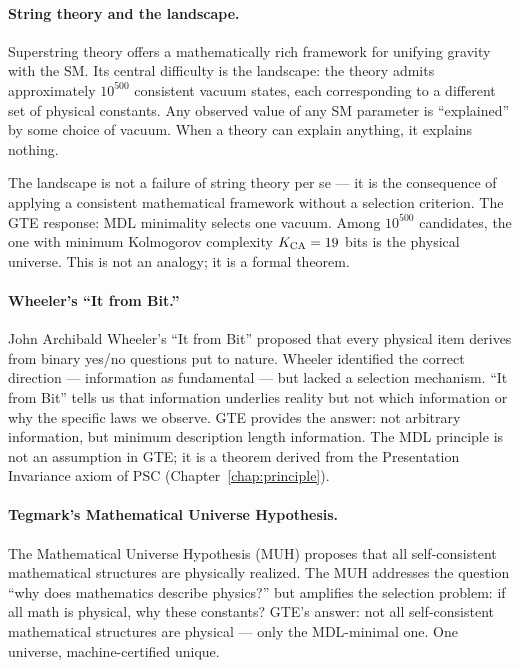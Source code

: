 \documentclass[11pt,openany]{book}
\theoremstyle{remark}
\begin{document}
\paragraph{String theory and the landscape.}
Superstring theory offers a mathematically rich framework for unifying gravity with the
SM.
Its central difficulty is the landscape: the theory admits approximately $10^{500}$
consistent vacuum states, each corresponding to a different set of physical constants.
Any observed value of any SM parameter is ``explained'' by some choice of vacuum.
When a theory can explain anything, it explains nothing.

The landscape is not a failure of string theory per se --- it is the consequence of
applying a consistent mathematical framework without a selection criterion.
The GTE response: MDL minimality selects one vacuum.
Among $10^{500}$ candidates, the one with minimum Kolmogorov complexity $K_{\rm CA}
= 19$ bits is the physical universe.
This is not an analogy; it is a formal theorem.

\paragraph{Wheeler's ``It from Bit.''}
John Archibald Wheeler's ``It from Bit'' proposed that every physical item derives
from binary yes/no questions put to nature.
Wheeler identified the correct direction --- information as fundamental --- but lacked
a selection mechanism.
``It from Bit'' tells us that information underlies reality but not which information
or why the specific laws we observe.
GTE provides the answer: not arbitrary information, but minimum description length
information.
The MDL principle is not an assumption in GTE; it is a theorem derived from the
Presentation Invariance axiom of PSC (Chapter~\ref{chap:principle}).

\paragraph{Tegmark's Mathematical Universe Hypothesis.}
The Mathematical Universe Hypothesis (MUH) proposes that all self-consistent
mathematical structures are physically realized.
The MUH addresses the question ``why does mathematics describe physics?'' but amplifies
the selection problem: if all math is physical, why these constants?
GTE's answer: not all self-consistent mathematical structures are physical --- only the
MDL-minimal one.
One universe, machine-certified unique.
\end{document}
